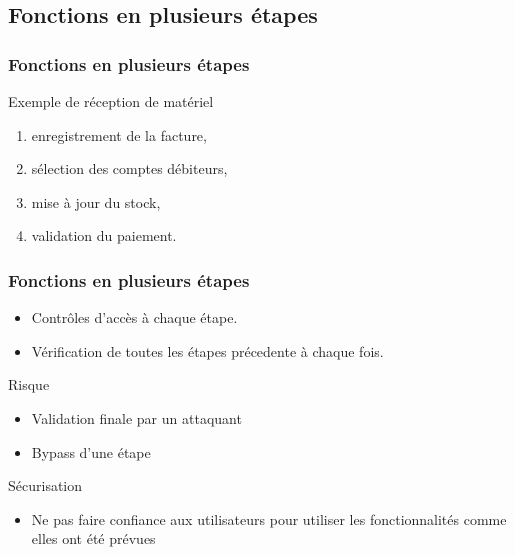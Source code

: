 \documentclass{beamer}
\begin{document}
\subsection{Fonctions en plusieurs étapes}


\begin{frame}
  \frametitle{Fonctions en plusieurs étapes}
  \begin{block}{Exemple de réception de matériel}
    \begin{enumerate}
        \item enregistrement de la facture,
        \item sélection des comptes débiteurs,
        \item mise à jour du stock,
        \item validation du paiement.
    \end{enumerate}
  \end{block}
\end{frame}
\begin{frame}
  \frametitle{Fonctions en plusieurs étapes}
  
  \begin{itemize}
    \item Contrôles d'accès à chaque étape.
    \item Vérification de toutes les étapes précedente à chaque fois.
  \end{itemize}
  \vspace{2em}
  \begin{alertblock}{Risque}
    \begin{itemize}
      \item Validation finale par un attaquant
      \item Bypass d'une étape
    \end{itemize}
  \end{alertblock}
  \begin{exampleblock}{Sécurisation}
    \begin{itemize}
      \item Ne pas faire confiance aux utilisateurs pour utiliser les fonctionnalités comme elles ont été prévues
    \end{itemize}
  \end{exampleblock}
  
\end{frame}
\end{document}
